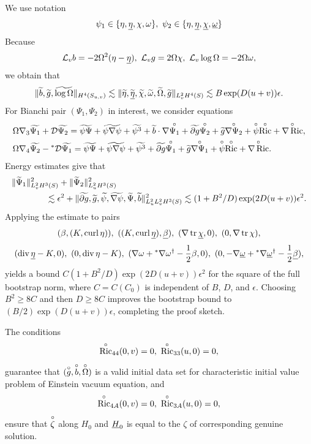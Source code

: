 We use notation
\[\psi_1\in\{\eta,\etab,\chi,\omega\},\ \psi_2\in\{\eta,\etab,\chib,\omegab\}\]
Because 
\[\Lie_v b=-2\Omega^2(\eta-\etab),\ \Lie_vg=2\Omega\chi,\ \Lie_v\log\Omega=-2\Omega\omega,\]
we obtain that
\begin{equation}
    \|\widetilde{b},\widetilde{g},\widetilde{\log\Omega}\|_{H^4(S_{u,v})}\lesssim \|\widetilde{\eta},\widetilde{\underline\eta},\widetilde{\chi},\widetilde{\omega},\widetilde{\Omega},\widetilde{g}\|_{L^2_vH^4(S)}\lesssim B\exp(D(u+v))\epsilon.
\end{equation}
For Bianchi pair $(\Psi_1,\Psi_2)$ in interest, we consider equations 
\begin{equation*}
    \begin{aligned}
        \Omega\nabla_3\widetilde{\Psi_1} &+\mathcal{D}\widetilde{\Psi_2}=\widetilde{\psi\Psi}+\widetilde{\psi\nabla\psi}+\widetilde{\psi^3}+\widetilde{b}\cdot\nabla\overset{\circ}{\Psi_1}+\widetilde{\partial g}\overset{\circ}{\Psi_2}+\widetilde{g}\overset{\circ}{\nabla\Psi_2}+\overset{\circ}\psi\overset{\circ}{\operatorname{Ric}}+\overset{\circ}{\nabla\operatorname{Ric}},\\
        \Omega\nabla_4\widetilde{\Psi_2} &-{}^*\mathcal{D}\widetilde{\Psi_1}=\widetilde{\psi\Psi}+\widetilde{\psi\nabla\psi}+\widetilde{\psi^3}+\widetilde{\partial g}\overset{\circ}{\Psi_1}+\widetilde{g}\overset{\circ}{\nabla\Psi_1}+\overset{\circ}\psi\overset{\circ}{\operatorname{Ric}}+\overset{\circ}{\nabla\operatorname{Ric}}.
    \end{aligned}
\end{equation*}
Energy estimates give that 
\begin{equation*}
    \begin{aligned}
        &\|\widetilde\Psi_1\|^2_{L^2_vH^3(S)}+\|\widetilde\Psi_2\|^2_{L^2_uH^3(S)}\\
        &\qquad\qquad\lesssim \epsilon^2+\|\widetilde{\partial g},\widetilde{g},\widetilde{\psi},\widetilde{\nabla\psi},\widetilde\Psi,\widetilde{b}\|^2_{L^2_uL^2_vH^3(S)}\lesssim (1+B^2/D)\exp(2D(u+v))\epsilon^2.
    \end{aligned}
\end{equation*}
Applying the estimate to pairs
\[(\beta,(K,\cl\eta)),\ ((K,\cl\etab),\betab),\ (\nabla\tr\chib,0),\ (0,\nabla\tr\chi),\]
\[ (\dv\etab-K,0),\ (0,\dv\eta-K),\ (\nabla\omega+{}^*\nabla\omega^\dagger-\frac{1}{2}\beta,0),\ (0,-\nabla\omegab+{}^*\nabla\omegab^\dagger-\frac{1}{2}\betab),\]
yields a bound $C(1+B^2/D)\exp(2D(u+v))\epsilon^2$ for the square of the full bootstrap norm, where $C=C(C_0)$ is independent of $B$, $D$, and $\epsilon$. Choosing $B^2\geq8C$ and then $D\geq8C$ improves the bootstrap bound to $(B/2)\exp(D(u+v))\epsilon$, completing the proof sketch.
\begin{remark}
    The conditions 
    \[\oc{\Rc}_{44}(0,v)=0,\ \oc{\Rc}_{33}(u,0)=0,\]
    guarantee that $(\overset{\circ}{g},\overset{\circ}{b},\overset{\circ}{\Omega})$ is a valid initial data set for characteristic initial value problem of Einstein vacuum equation, and 
    \[\oc{\Rc}_{4A}(0,v)=0,\ \oc{\Rc}_{3A}(u,0)=0,\]
    ensure that $\overset{\circ}\zeta$ along $H_{0}$ and $\underline H_0$ is equal to the $\zeta$ of corresponding genuine solution. 
\end{remark}


